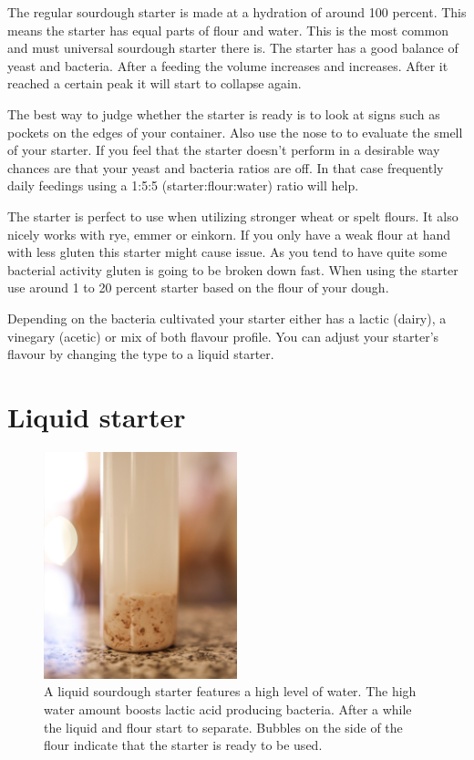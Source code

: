 The regular sourdough starter is made at a hydration of around 100 percent.
This means the starter has equal parts of flour and water. This is the most
common and must universal sourdough starter there is. The starter has a good
balance of yeast and bacteria. After a feeding the volume increases and
increases. After it reached a certain peak it will start to collapse again.

The best way to judge whether the starter is ready is to look at signs such as
pockets on the edges of your container. Also use the nose to to evaluate the
smell of your starter. If you feel that the starter doesn't perform in a
desirable way chances are that your yeast and bacteria ratios are off. In that
case frequently daily feedings using a 1:5:5 (starter:flour:water) ratio will
help.

The starter is perfect to use when utilizing stronger wheat or spelt flours.
It also nicely works with rye, emmer or einkorn. If you only have a weak flour
at hand with less gluten this starter might cause issue. As you tend to have
quite some bacterial activity gluten is going to be broken down fast. When
using the starter use around 1 to 20 percent starter based on the flour of your
dough.

Depending on the bacteria cultivated your starter either has a lactic (dairy),
a vinegary (acetic) or mix of both flavour profile. You can adjust your
starter's flavour by changing the type to a liquid starter.

\section{Liquid starter}
\label{section:liquid-starter}

\begin{figure}[!htb]
  \centering
  \includegraphics[width=0.5\textwidth]{sourdough-starter-liquid.jpg}
  \caption{A liquid sourdough starter features a high level of water. The high
  water amount boosts lactic acid producing bacteria. After a while the liquid
  and flour start to separate. Bubbles on the side of the flour
  indicate that the starter is ready to be used.}
  \label{fig:liquid-sourdough-starter}
\end{figure}


